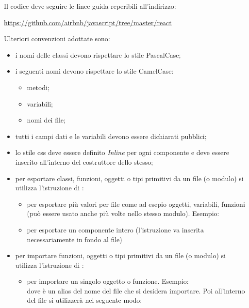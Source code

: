 	            Il codice deve seguire le linee guida reperibili all'indirizzo:
	            \begin{center} \label{sec:stileCodifica}
	            	\url{https://github.com/airbnb/javascript/tree/master/react}
	            \end{center}
            	Ulteriori convenzioni adottate sono:
            	\begin{itemize}
            		\item i nomi delle classi devono rispettare lo stile PascalCase;
            		\item i seguenti nomi devono rispettare lo stile CamelCase:
            			\begin{itemize}
            				\item metodi;
            				\item variabili;
            				\item nomi dei file;
            			\end{itemize}
            		\item tutti i campi dati e le variabili devono essere dichiarati pubblici;
            		\item lo stile css deve essere definito \textit{Inline} per ogni componente e deve essere inserito all'interno del costruttore dello stesso;
            		\item per esportare classi, funzioni, oggetti o tipi primitivi da un file (o modulo) si utilizza l'istruzione  di \jsv{}:
            			\begin{itemize}
            				\item per esportare  più valori per file come ad esepio oggetti, variabili, funzioni (può essere usato anche più volte nello stesso modulo). Esempio: 
            				\item per esportare un componente intero (l'istruzione va inserita necessariamente in fondo al file) 
            			\end{itemize}
            		\item per importare funzioni, oggetti o tipi primitivi da un file (o modulo) si utilizza l'istruzione  di \jsv{}:
            			\begin{itemize}
            				\item per importare un singolo oggetto o funzione. Esempio: \\  dove  è un alias del nome del file che si desidera importare. Poi all'interno del file si utilizzerà nel seguente modo: 

\end{itemize}
\end{itemize}
